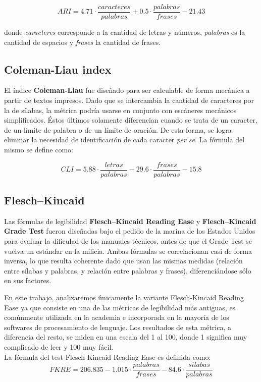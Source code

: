 \documentclass[12pt,journal,compsoc]{IEEEtran}
\begin{document}
$$ARI = 4.71\cdot \frac{caracteres}{palabras}+0.5\cdot \frac{palabras}{frases} - 21.43$$

donde \textit{caracteres} corresponde a la cantidad de letras y números, \textit{palabras} es la cantidad de espacios y \textit{frases} la cantidad de frases.

\subsection{Coleman-Liau index}

El índice \textbf{Coleman-Liau}\cite{coleman-liau} fue diseñado para ser calculable de forma mecánica a partir de textos impresos. Dado que se intercambia la cantidad de caracteres por la de sílabas, la métrica podría usarse en conjunto con escáneres mecánicos simplificados. Éstos últimos solamente diferencian cuando se trata de un caracter, de un límite de palabra o de un límite de oración. De esta forma, se logra eliminar la necesidad de identificación de cada caracter \textit{per se}.
La fórmula del mismo se define como:

$$CLI = 5.88 \cdot \frac{letras}{palabras} - 29.6 \cdot \frac{frases}{palabras} - 15.8$$


\subsection{Flesch–Kincaid}
Las fórmulas de legibilidad \textbf{Flesch–Kincaid Reading Ease}\cite{ari-flesch} y \textbf{Flesch–Kincaid Grade Test} fueron diseñadas bajo el pedido de la marina de los Estados Unidos para evaluar la dificulad de los manuales técnicos, antes de que el Grade Test se vuelva un estándar en la milicia. Ambas fórmulas se correlacionan casi de forma inversa, lo que resulta coherente dado que usan las mismas medidas (relación entre sílabas y palabras, y relación entre palabras y frases), diferenciándose sólo en sus factores.

En este trabajo, analizaremos únicamente la variante Flesch-Kincaid Reading Ease ya que consiste en una de las métricas de legibilidad más antiguas, es comúnmente utilizada en la academia e incorporada en la mayoría de los softwares de procesamiento de lenguaje. Los resultados de esta métrica, a diferencia del resto, se miden en una escala del 1 al 100, donde 1 significa muy complicado de leer y 100 muy fácil.\\

La fórmula del test Flesch-Kincaid Reading Ease es definida como:
$$FKRE = 206.835 - 1.015\cdot \frac{palabras}{frases} - 84.6\cdot \frac{silabas}{palabras}$$
\end{document}
